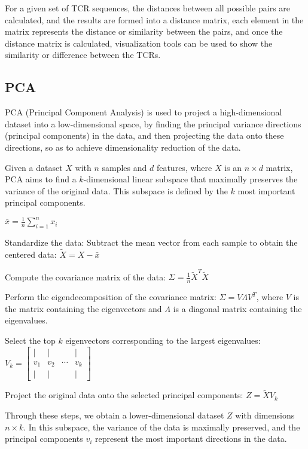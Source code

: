 \documentclass[conference]{IEEEtran}
\begin{document}
	For a given set of TCR sequences, the distances between all possible pairs are calculated, and the results are formed into a distance matrix, each element in the matrix represents the distance or similarity between the pairs, and once the distance matrix is calculated, visualization tools can be used to show the similarity or difference between the TCRs.
	
	\subsection{PCA}\label{AA}
	PCA (Principal Component Analysis) is used to project a high-dimensional dataset into a low-dimensional space, by finding the principal variance directions (principal components) in the data, and then projecting the data onto these directions, so as to achieve dimensionality reduction of the data.
	
	Given a dataset \( X \) with \( n \) samples and \( d \) features, where \( X \) is an \( n \times d \) matrix, PCA aims to find a \( k \)-dimensional linear subspace that maximally preserves the variance of the original data. This subspace is defined by the \( k \) most important principal components.
	
	$\bar{x} = \frac{1}{n} \sum_{i=1}^{n} x_i$
	
	Standardize the data: Subtract the mean vector from each sample to obtain the centered data: \( \tilde{X} = X - \bar{x} \)
	
	Compute the covariance matrix of the data: \( \Sigma = \frac{1}{n} \tilde{X}^T \tilde{X} \)
	
	Perform the eigendecomposition of the covariance matrix: $\Sigma = V \Lambda V^T$, where $V$ is the matrix containing the eigenvectors and $\Lambda$ is a diagonal matrix containing the eigenvalues.
	
	Select the top \(k\) eigenvectors corresponding to the largest eigenvalues: \(V_k = \begin{bmatrix} | & | & & | \\ v_1 & v_2 & \cdots & v_k \\ | & | & & | \end{bmatrix}\)
	
	Project the original data onto the selected principal components: \(Z = \tilde{X} V_k\)
	
	Through these steps, we obtain a lower-dimensional dataset \(Z\) with dimensions \(n \times k\). In this subspace, the variance of the data is maximally preserved, and the principal components \(v_i\) represent the most important directions in the data.
\end{document}
